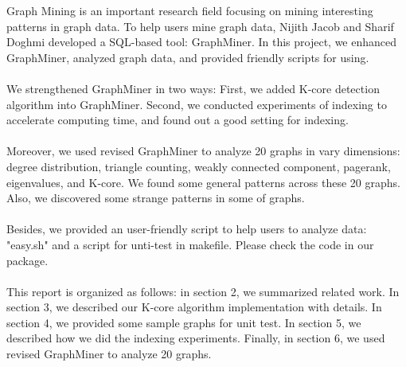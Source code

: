 Graph Mining is an important research field focusing on mining interesting patterns in graph data. To help users mine graph data, Nijith Jacob and Sharif Doghmi developed a SQL-based tool: GraphMiner. In this project, we enhanced GraphMiner, analyzed graph data, and provided friendly scripts for using.  
\\
\\
We strengthened GraphMiner in two ways: First, we added K-core detection algorithm into GraphMiner. Second, we conducted experiments of indexing to accelerate computing time, and found out a good setting for indexing. 
\\
\\
Moreover, we used revised GraphMiner to analyze 20 graphs in vary dimensions: degree distribution, triangle counting, weakly connected component, pagerank, eigenvalues, and K-core. We found some general patterns across these 20 graphs. Also, we discovered some strange patterns in some of graphs.
\\
\\
Besides, we provided an user-friendly script to help users to analyze data: "easy.sh" and a script for unti-test in makefile. Please check the code in our package.
\\
\\
This report is organized as follows: in section 2, we summarized related work. In section 3, we described our K-core algorithm implementation with details. In section 4, we provided some sample graphs for unit test. In section 5, we described how we did the indexing experiments. Finally, in section 6, we used revised GraphMiner to analyze 20 graphs. 